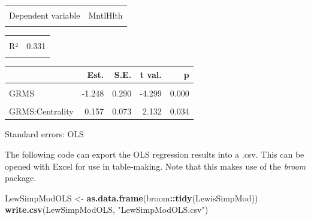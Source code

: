 \documentclass[
  11pt,
]{book}
\newenvironment{Shaded}{\begin{snugshade}}{\end{snugshade}}
\newcommand{\FunctionTok}[1]{\textcolor[rgb]{0.27,0.27,0.27}{\textbf{#1}}}
\newcommand{\NormalTok}[1]{#1}
\newcommand{\OtherTok}[1]{\textcolor[rgb]{0.37,0.37,0.37}{#1}}
\newcommand{\SpecialCharTok}[1]{\textcolor[rgb]{0.43,0.43,0.43}{\textbf{#1}}}
\newcommand{\StringTok}[1]{\textcolor[rgb]{0.5,0.5,0.5}{#1}}
\begin{document}
\begin{table}[!h]
\centering
\begin{tabular}{lr}
\toprule
\cellcolor{gray!6}{Observations} & \cellcolor{gray!6}{231}\\
Dependent variable & MntlHlth\\
\cellcolor{gray!6}{Type} & \cellcolor{gray!6}{OLS linear regression}\\
\bottomrule
\end{tabular}
\end{table} \begin{table}[!h]
\centering
\begin{tabular}{lr}
\toprule
\cellcolor{gray!6}{F(3,227)} & \cellcolor{gray!6}{37.386}\\
R² & 0.331\\
\cellcolor{gray!6}{Adj. R²} & \cellcolor{gray!6}{0.322}\\
\bottomrule
\end{tabular}
\end{table} \begin{table}[!h]
\centering
\begin{threeparttable}
\begin{tabular}{lrrrr}
\toprule
  & Est. & S.E. & t val. & p\\
\midrule
\cellcolor{gray!6}{(Intercept)} & \cellcolor{gray!6}{6.138} & \cellcolor{gray!6}{0.767} & \cellcolor{gray!6}{8.007} & \cellcolor{gray!6}{0.000}\\
GRMS & -1.248 & 0.290 & -4.299 & 0.000\\
\cellcolor{gray!6}{Centrality} & \cellcolor{gray!6}{-0.351} & \cellcolor{gray!6}{0.199} & \cellcolor{gray!6}{-1.764} & \cellcolor{gray!6}{0.079}\\
GRMS:Centrality & 0.157 & 0.073 & 2.132 & 0.034\\
\bottomrule
\end{tabular}
\begin{tablenotes}
\item Standard errors: OLS
\end{tablenotes}
\end{threeparttable}
\end{table}

The following code can export the OLS regression results into a .csv. This can be opened with Excel for use in table-making. Note that this makes use of the \emph{broom} package.

\begin{Shaded}
\begin{Highlighting}[]
\NormalTok{LewSimpModOLS }\OtherTok{\textless{}{-}} \FunctionTok{as.data.frame}\NormalTok{(broom}\SpecialCharTok{::}\FunctionTok{tidy}\NormalTok{(LewisSimpMod))}
\FunctionTok{write.csv}\NormalTok{(LewSimpModOLS, }\StringTok{"LewSimpModOLS.csv"}\NormalTok{)}
\end{Highlighting}
\end{Shaded}
\end{document}
